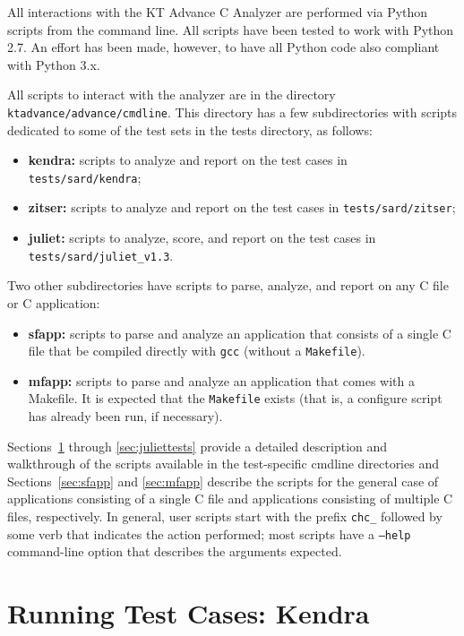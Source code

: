 \documentclass[11pt]{article}
\begin{document}
All interactions with the KT Advance C Analyzer are performed via Python scripts from the
command line. All scripts have been tested to work with Python 2.7. An effort has been
made, however, to have all Python code also compliant with Python 3.x.

All scripts to interact with the analyzer are in the directory 
{\tt ktadvance/advance/cmdline}. 
This directory has a few subdirectories with scripts dedicated to some of the test 
sets in the tests directory, as follows:
\begin{itemize}
\item {\bf kendra:} scripts to analyze and report on the test cases in 
 {\tt tests/sard/kendra};
\item {\bf zitser:} scripts to analyze and report on the test cases in
 {\tt tests/sard/zitser};
\item {\bf juliet:} scripts to analyze, score, and report on the test cases in
 {\tt tests/sard/juliet\_v1.3}.
\end{itemize}

Two other subdirectories have scripts to parse, analyze, and report on any C file or
C application:
\begin{itemize}
\item {\bf sfapp:} scripts to parse and analyze an application that consists of a single
  C file that be compiled directly with {\tt gcc} (without a {\tt Makefile}). 
\item {\bf mfapp:} scripts to parse and analyze an application that comes with a Makefile.
  It is expected that the {\tt Makefile} exists (that is, a configure script has already been
  run, if necessary).
\end{itemize}

Sections~\ref{sec:kendratests} through \ref{sec:juliettests} provide a detailed 
description and walkthrough of the scripts available in
the test-specific cmdline directories and Sections~\ref{sec:sfapp} and \ref{sec:mfapp}
describe the scripts
for the general case of applications consisting of a single C file and applications
consisting of multiple C files, respectively. In general, user scripts start with the 
prefix {\tt chc\_} followed by some verb that indicates the action performed; most 
scripts have a {\tt --help} command-line option that describes the arguments expected.

\section{Running Test Cases: Kendra}
\label{sec:kendratests}
\end{document}
